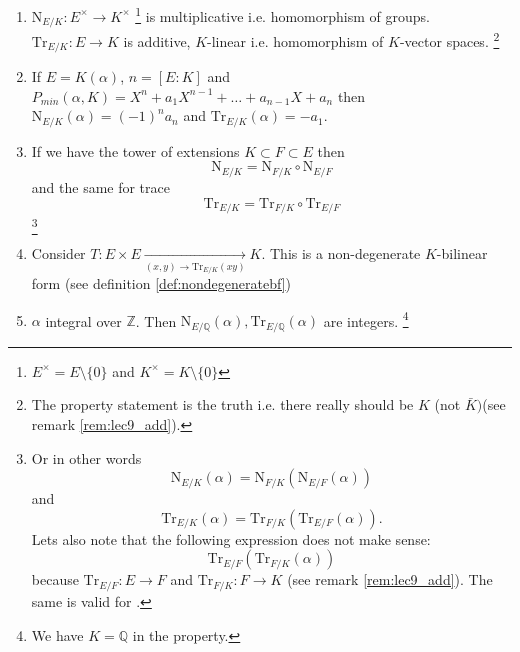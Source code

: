 \begin{property}
  \begin{enumerate}
  \item $\mathrm{N}_{E/K}: E^\times \to K^\times$
    \footnote{
      $E^\times = E \setminus \{0\}$ and
      $K^\times = K \setminus \{0\}$
    }
    is multiplicative
    i.e. homomorphism of groups.
    $\mathrm{Tr}_{E/K}: E \to K$ is additive, $K$-linear
    i.e. homomorphism of $K$-vector spaces.
    \footnote{
      The property statement is the truth i.e.
      there really should be $K$ (not $\bar{K})$(see remark
      \ref{rem:lec9_add}).
    }    
  \item If $E=K\left(\alpha\right)$, $n = \left[E:K\right]$ and
    $P_{min}\left(\alpha, K\right) = X^n + a_1 X^{n-1} + \dots +
    a_{n-1} X + a_{n}$ then $\mathrm{N}_{E/K}\left(\alpha\right) = (-1)^n
    a_n$ and $\mathrm{Tr}_{E/K}\left(\alpha\right) = -a_1$.
  \item If we have the tower of extensions $K \subset F \subset E$
    then
    \[
    \mathrm{N}_{E/K} =
    \mathrm{N}_{F/K} \circ
    \mathrm{N}_{E/F}
    \]
    and the same for trace
    \[
    \mathrm{Tr}_{E/K} =
    \mathrm{Tr}_{F/K} \circ
    \mathrm{Tr}_{E/F}
    \]
    \footnote{      
      Or in other words
      \[
      \mathrm{N}_{E/K}\left(\alpha\right) =
      \mathrm{N}_{F/K} \left(
      \mathrm{N}_{E/F}\left(\alpha\right)
      \right)
      \]
      and
      \[
      \mathrm{Tr}_{E/K}\left(\alpha\right) =
      \mathrm{Tr}_{F/K} \left(
      \mathrm{Tr}_{E/F}\left(\alpha\right)
      \right).
      \]
      Lets also note \cite{bib:KeithConradTraceNorm2} that the
      following expression does not make sense:
      \[
      \mathrm{Tr}_{E/F} \left(
      \mathrm{Tr}_{F/K}\left(\alpha\right)\right)
      \]
      because $\mathrm{Tr}_{E/F}: E \to F$ and
      $\mathrm{Tr}_{F/K}: F \to K$ (see remark
      \ref{rem:lec9_add}).
      The same is valid for .  
    }
    \item Consider $T: E \times E \xrightarrow[(x, y) \to
      \mathrm{Tr}_{E/K}\left(xy\right)  ]{} K$. This is a
      non-degenerate $K$-bilinear form (see
      definition \ref{def:nondegeneratebf}) 
    \item $\alpha$ integral over $\mathbb{Z}$. Then
      $\mathrm{N}_{E/\mathbb{Q}}\left(\alpha\right),
      \mathrm{Tr}_{E/\mathbb{Q}}\left(\alpha\right)$ are integers.
      \footnote{
        We have $K = \mathbb{Q}$ in the property.
      }
  \end{enumerate}
  \label{property:lec9_norm_trace}

\end{property}
